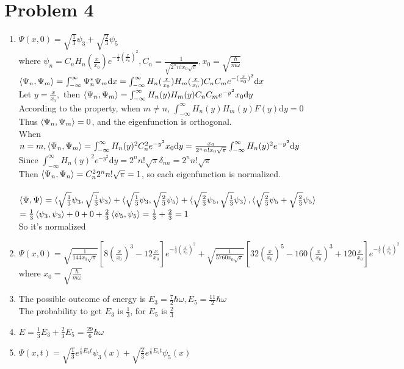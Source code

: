 \documentclass[a4paper]{article}
\begin{document}
\section{Problem 4}
    \begin{enumerate}
        \item $\Psi(x,0)=\sqrt{\frac{1}{3}}\psi_3+\sqrt{\frac{2}{3}}\psi_5$
        \\where $\psi_n=C_nH_n(\frac{x}{x_0})e^{-\frac{1}{2}(\frac{x}{x_0})^2},C_n=\frac{1}{\sqrt{2^nn!x_0\sqrt{\pi}}},x_0=\sqrt{\frac{\hbar}{m\omega}}$
        \\$\braket{\Psi_n,\Psi_m}=\int_{-\infty}^\infty\Psi_n^*\Psi_m\mathrm{d}x=\int_{-\infty}^\infty H_n(\frac{x}{x_0})H_m(\frac{x}{x_0})C_nC_me^{-(\frac{x}{x_0})^2}\mathrm{d}x$
        \\Let $y=\frac{x}{x_0},$ then $\braket{\Psi_n,\Psi_m}=\int_{-\infty}^\infty H_n(y)H_m(y)C_nC_me^{-y^2}x_0\mathrm{d}y$
        \\According to the property, when $m\neq n$, $\int_{-\infty}^\infty H_n(y)H_m(y)F(y)\mathrm{d}y=0$
        \\Thus $\braket{\Psi_n,\Psi_m}=0$, and the eigenfunction is orthogonal.
        \\When $n=m,\braket{\Psi_n,\Psi_m}=\int_{-\infty}^\infty H_n(y)^2C_n^2e^{-y^2}x_0\mathrm{d}y=\frac{x_0}{2^nn!x_0\sqrt{\pi}}\int_{-\infty}^\infty H_n(y)^2e^{-y^2}\mathrm{d}y$
        \\Since $\int_{-\infty}^\infty H_n(y)^2e^{-y^2}\mathrm{d}y=2^nn!\sqrt{\pi}\delta_{nn}=2^nn!\sqrt{\pi}$
        \\Then $\braket{\Psi_n,\Psi_n}=C_n^22^nn!\sqrt{\pi}=1$, so each eigenfunction is normalized.
        \\\\$\braket{\Psi,\Psi}=\braket{\sqrt{\frac{1}{3}}\psi_3,\sqrt{\frac{1}{3}}\psi_3}+\braket{\sqrt{\frac{1}{3}}\psi_3,\sqrt{\frac{2}{3}}\psi_5}+\braket{\sqrt{\frac{2}{3}}\psi_5,\sqrt{\frac{1}{3}}\psi_3},\braket{\sqrt{\frac{2}{3}}\psi_5+\sqrt{\frac{2}{3}}\psi_5}$
        \\$=\frac{1}{3}\braket{\psi_3,\psi_3}+0+0+\frac{2}{3}\braket{\psi_5,\psi_5}=\frac{1}{3}+\frac{2}{3}=1$
        \\So it's normalized
        \item $\Psi(x,0)=\sqrt{\frac{1}{144x_0\sqrt{\pi}}}[8(\frac{x}{x_0})^3-12\frac{x}{x_0}]e^{-\frac{1}{2}(\frac{x}{x_0})^2}+\sqrt{\frac{1}{5760x_0\sqrt{\pi}}}[32(\frac{x}{x_0})^5-160(\frac{x}{x_0})^3+120\frac{x}{x_0}]e^{-\frac{1}{2}(\frac{x}{x_0})^2}$
        \\where $x_0=\sqrt{\frac{\hbar}{m\omega}}$
        \item The possible outcome of energy is $E_3=\frac{7}{2}\hbar\omega,E_5=\frac{11}{2}\hbar\omega$
        \\The probability to get $E_3$ is $\frac{1}{3}$, for $E_5$ is $\frac{2}{3}$
        \item $E=\frac{1}{3}E_3+\frac{2}{3}E_5=\frac{29}{6}\hbar\omega$
        \item $\Psi(x,t)=\sqrt{\frac{1}{3}}e^{\frac{i}{\hbar}E_3t}\psi_3(x)+\sqrt{\frac{2}{3}}e^{\frac{i}{\hbar}E_5t}\psi_5(x)$
    \end{enumerate}
\end{document}
